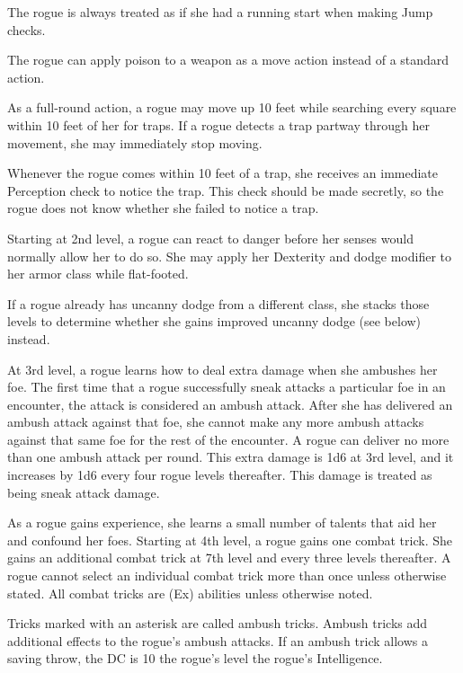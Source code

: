  The rogue is always treated as if she had a running start when making Jump checks.

 The rogue can apply poison to a weapon as a move action instead of a standard action.

 As a full-round action, a rogue may move up 10 feet while searching every square within 10 feet of her for traps. If a rogue detects a trap partway through her movement, she may immediately stop moving.

 Whenever the rogue comes within 10 feet of a trap, she receives an immediate Perception check to notice the trap. This check should be made secretly, so the rogue does not know whether she failed to notice a trap.

 Starting at 2nd level, a rogue can react to danger before her senses would normally allow her to do so. She may apply her Dexterity and dodge modifier to her armor class while flat-footed.

If a rogue already has uncanny dodge from a different class, she stacks those levels to determine whether she gains improved uncanny dodge (see below) instead.

 At 3rd level, a rogue learns how to deal extra damage when she ambushes her foe. The first time that a rogue successfully sneak attacks a particular foe in an encounter, the attack is considered an ambush attack. After she has delivered an ambush attack against that foe, she cannot make any more ambush attacks against that same foe for the rest of the encounter. A rogue can deliver no more than one ambush attack per round. This extra damage is 1d6 at 3rd level, and it increases by 1d6 every four rogue levels thereafter. This damage is treated as being sneak attack damage.

 As a rogue gains experience, she learns a small number of talents that aid her and confound her foes. Starting at 4th level, a rogue gains one combat trick. She gains an additional combat trick at 7th level and every three levels thereafter. A rogue cannot select an individual combat trick more than once unless otherwise stated. All combat tricks are (Ex) abilities unless otherwise noted.

\par Tricks marked with an asterisk are called ambush tricks. Ambush tricks add additional effects to the rogue's ambush attacks. If an ambush trick allows a saving throw, the DC is 10 \add the rogue's level \add the rogue's Intelligence.

